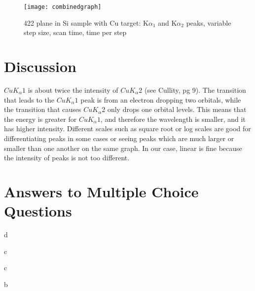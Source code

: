 \documentclass{article}
\begin{document}
\begin{figure}[h]
\begin{center}
\texttt{[image: combinedgraph]} %
\caption{{422} plane in Si sample with Cu target: K$\alpha_1$ and K$\alpha_2$ peaks, variable step size, scan time, time per step}
\end{center}
\end{figure}


\section{Discussion}
$CuK_\alpha1$ is about twice the intensity of $CuK_\alpha2$ (see Cullity, pg 9). The transition that leads to the $CuK_\alpha1$ peak is from an electron dropping two orbitals, while the transition that causes $CuK_\alpha2$ only drops one orbital levels. This means that the energy is greater for $CuK_\alpha1$, and therefore the wavelength is smaller, and it has higher intensity. Different scales such as square root or log scales are good for differentiating peaks in some cases or seeing peaks which are much larger or smaller than one another on the same graph. In our case, linear is fine because the intensity of peaks is not too different. 




\section{Answers to Multiple Choice Questions}
\begin{enumerate}[label=(\roman*)]
\begin{item}
d
\end{item}
\begin{item}
c
\end{item}
\begin{item}
c
\end{item}
\begin{item}
b
\end{item}

\end{enumerate}






\end{document}
